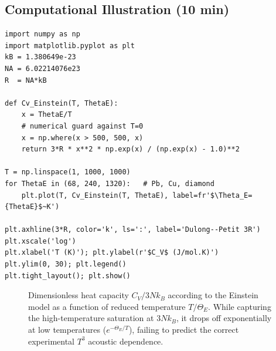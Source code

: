 \documentclass[11pt,a4paper]{article}
\begin{document}
\subsection{Computational Illustration \hfill \small(10 min)}

\begin{pybox}
\begin{lstlisting}
import numpy as np
import matplotlib.pyplot as plt
kB = 1.380649e-23
NA = 6.02214076e23
R  = NA*kB

def Cv_Einstein(T, ThetaE):
    x = ThetaE/T
    # numerical guard against T=0
    x = np.where(x > 500, 500, x)
    return 3*R * x**2 * np.exp(x) / (np.exp(x) - 1.0)**2

T = np.linspace(1, 1000, 1000)
for ThetaE in (68, 240, 1320):   # Pb, Cu, diamond
    plt.plot(T, Cv_Einstein(T, ThetaE), label=fr'$\Theta_E={ThetaE}$~K')

plt.axhline(3*R, color='k', ls=':', label='Dulong--Petit 3R')
plt.xscale('log')
plt.xlabel('T (K)'); plt.ylabel(r'$C_V$ (J/mol.K)')
plt.ylim(0, 30); plt.legend()
plt.tight_layout(); plt.show()
\end{lstlisting}
\end{pybox}

\begin{figure}[htbp]
\centering
{}
\caption{Dimensionless heat capacity $C_V/3Nk_B$ according to the Einstein model as a function of reduced temperature $T/\Theta_E$. While capturing the high-temperature saturation at $3Nk_B$, it drops off exponentially at low temperatures ($e^{-\Theta_E/T}$), failing to predict the correct experimental $T^3$ acoustic dependence.}
\label{fig:einstein_model_curve}
\end{figure}
\end{document}
